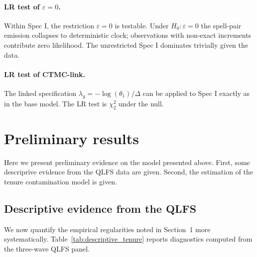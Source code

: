 \documentclass[12pt]{article}
\begin{document}
\paragraph{LR test of \(\varepsilon = 0\).} Within Spec I, the restriction
\(\varepsilon = 0\) is testable. Under \(H_0: \varepsilon = 0\) the spell-pair
emission collapses to deterministic clock; observations with non-exact
increments contribute zero likelihood. The unrestricted Spec I dominates
trivially given the data.

\paragraph{LR test of CTMC-link.} The linked specification \(\lambda_g = -\log(\theta_1)/\Delta\)
can be applied to Spec I exactly as in the base model. The LR test is
\(\chi^2_2\) under the null.

\section{Preliminary results}
\label{sec:preliminary_results}
Here we present preliminary evidence on the model presented above. 
First, some descriprive evidence from the QLFS data are given. 
Second, the estimation of the tenure contamination model is given. 

\subsection{Descriptive evidence from the QLFS}

We now quantify the empirical regularities noted in Section~1 more
systematically. Table~\ref{tab:descriptive_tenure} reports diagnostics
computed from the three-wave QLFS panel.
\end{document}
